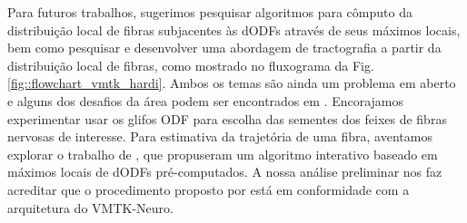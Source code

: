 \documentclass[
    12pt,                %
    oneside,            %
    a4paper,            %
    english,            %
    french,                %
    spanish,            %
    brazil                %
    ]{abntex2}
\begin{document}





Para futuros trabalhos, sugerimos pesquisar algoritmos para cômputo da distribuição local de fibras subjacentes às dODFs através de seus máximos locais, bem como pesquisar e desenvolver uma abordagem de tractografia a partir da distribuição local de fibras, como mostrado no fluxograma da Fig. \ref{fig::flowchart_vmtk_hardi}.
Ambos os temas são ainda um problema em aberto e alguns dos desafios da área podem ser encontrados em .
Encorajamos experimentar usar os glifos ODF para escolha das sementes dos feixes de fibras nervosas de interesse. 
Para estimativa da trajetória de uma fibra, aventamos explorar o trabalho de , que propuseram um algoritmo interativo baseado em máximos locais de dODFs pré-computados. A nossa análise preliminar nos faz acreditar que o procedimento proposto por  está em conformidade com a arquitetura do VMTK-Neuro.

\end{document}
